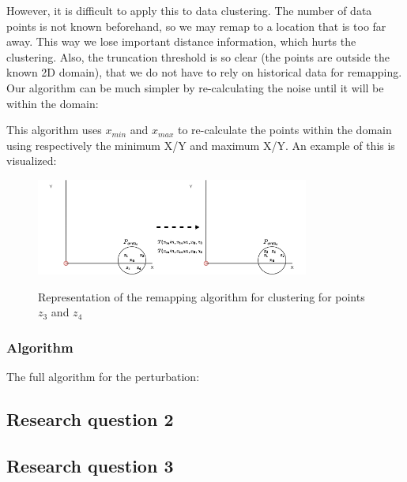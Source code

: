 However, it is difficult to apply this to data clustering.
The number of data points is not known beforehand, so we may remap to a location that is too far away.
This way we lose important distance information, which hurts the clustering.
Also, the truncation threshold is so clear (the points are outside the known 2D domain), that we do not have to rely on historical data for remapping.
Our algorithm can be much simpler by re-calculating the noise until it will be within the domain:

This algorithm uses $x_{min}$ and $x_{max}$ to re-calculate the points within the domain using respectively the minimum X/Y and maximum X/Y.
An example of this is visualized:
\begin{figure}[h]
  \includegraphics[width=0.8\textwidth]{Method/images/truncation-rq1.png}
  \label{fig:truncation}
  \centering
  \caption{Representation of the remapping algorithm for clustering for points $z_3$ and $z_4$ }
\end{figure}


\subsubsection{Algorithm}
The full algorithm for the perturbation:


\subsection{Research question 2}
\subsection{Research question 3}

